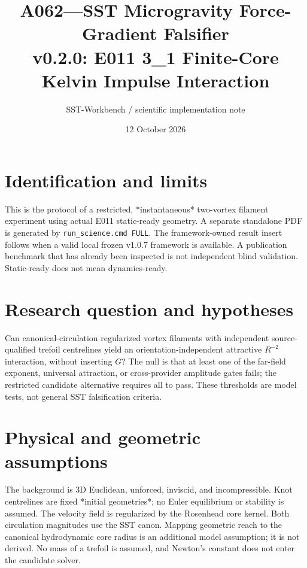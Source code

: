 \documentclass[11pt,a4paper]{article}
\title{A062---SST Microgravity Force-Gradient Falsifier\\\large v0.2.0: E011 3\_1 Finite-Core Kelvin Impulse Interaction}
\author{SST-Workbench / scientific implementation note}
\date{12 October 2026}
\begin{document}
\maketitle
\section{Identification and limits}
This is the protocol of a restricted, *instantaneous* two-vortex filament experiment using actual E011 static-ready geometry. A separate standalone PDF is generated by \texttt{run\_science.cmd FULL}. The framework-owned result insert follows when a valid local frozen v1.0.7 framework is available. A publication benchmark that has already been inspected is not independent blind validation. Static-ready does not mean dynamics-ready.
\section{Research question and hypotheses}
Can canonical-circulation regularized vortex filaments with independent source-qualified trefoil centrelines yield an orientation-independent attractive $R^{-2}$ interaction, without inserting $G$? The null is that at least one of the far-field exponent, universal attraction, or cross-provider amplitude gates fails; the restricted candidate alternative requires all to pass. These thresholds are model tests, not general SST falsification criteria.
\section{Physical and geometric assumptions}
The background is 3D Euclidean, unforced, inviscid, and incompressible. Knot centrelines are fixed *initial geometries*; no Euler equilibrium or stability is assumed. The velocity field is regularized by the Rosenhead core kernel. Both circulation magnitudes use the SST canon. Mapping geometric reach to the canonical hydrodynamic core radius is an additional model assumption; it is not derived. No mass of a trefoil is assumed, and Newton's constant does not enter the candidate solver.
\end{document}
